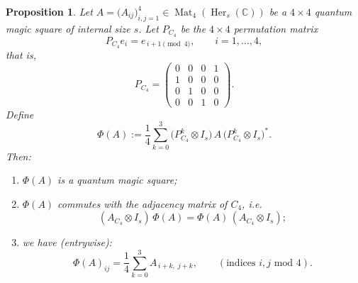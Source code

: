 \documentclass[10pt,a4paper]{amsart}
\newtheorem{proposition}{Proposition}
\newcommand{\C}{\mathbb{C}}
\newcommand{\Her}[2][\C]{\operatorname{Her}_{#2}(#1)}
\begin{document}
\begin{proposition}\label{prop:Z4-averaging}
Let \(A=\bigl(A_{ij}\bigr)_{i,j=1}^4 \in \operatorname{Mat}_4(\Her{s})\) be a \(4\times 4\) quantum magic square of internal size \(s\).
Let \(P_{C_4}\) be the \(4\times 4\) permutation matrix
\[
P_{C_4} e_i = e_{\,i+1 \pmod 4}, \qquad i=1,\dots,4,
\]
that is,
\[
P_{C_4} =
\begin{pmatrix}
0 & 0 & 0 & 1\\
1 & 0 & 0 & 0\\
0 & 1 & 0 & 0\\
0 & 0 & 1 & 0
\end{pmatrix}.
\]
Define
\[
\Phi(A) := \frac{1}{4}\sum_{k=0}^{3} 
\bigl(P_{C_4}^{k}\otimes I_s\bigr)\,
A\,
\bigl(P_{C_4}^{k}\otimes I_s\bigr)^{*}.
\]
Then:
\begin{enumerate}
    \item[(i)] \(\Phi(A)\) is a quantum magic square;
    \item[(ii)] \(\Phi(A)\) commutes with the adjacency matrix of \(C_4\), i.e.
    \[
    (A_{C_4}\otimes I_s)\, \Phi(A) = \Phi(A)\, (A_{C_4}\otimes I_s);
    \]
    \item[(iii)]  we have (entrywise):
    \[
    \Phi(A)_{ij}
      = \frac{1}{4}\sum_{k=0}^3 A_{\,i+k,\; j+k},
    \qquad (\text{indices } i,j \text{ mod } 4).
    \]
\end{enumerate}
\end{proposition}
\end{document}
